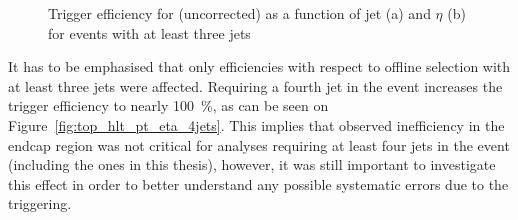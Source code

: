 \begin{figure}[hbtp]
  \centering
  \hfill
  \caption[Trigger efficiency for \HLTThreeCentralPFJet as a function of jet \pt and $\eta$]{Trigger efficiency for
  \HLTThreeCentralPFJet (uncorrected) as a function of jet \pt (a) and $\eta$ (b) for events with at least three jets}
\label{fig:top_hlt_pt_eta_3jets} 
\end{figure}

It has to be emphasised that only efficiencies with respect to offline selection with at least three jets were affected.
Requiring a fourth jet in the event increases the trigger efficiency to nearly \SI{100}{\percent}, as can be seen on
Figure~\ref{fig:top_hlt_pt_eta_4jets}. This implies that observed inefficiency in the endcap region was not critical for
analyses requiring at least four jets in the event (including the ones in this thesis), however, it was still important
to investigate this effect in order to better understand any possible systematic errors due to the triggering.

